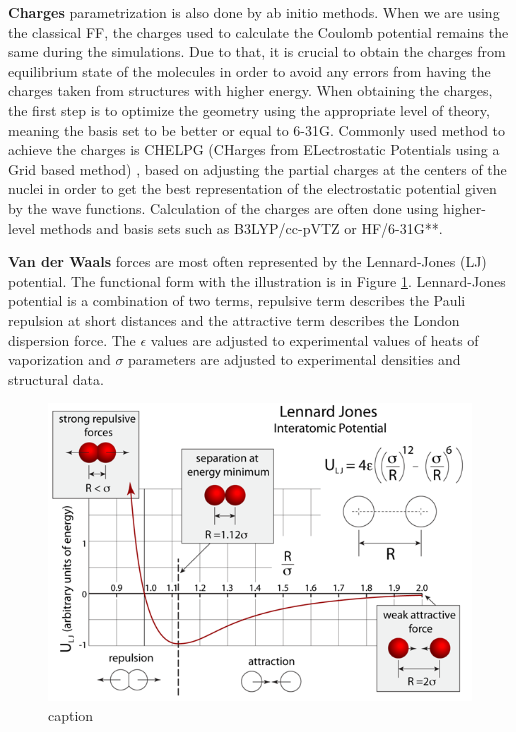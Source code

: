 \textbf{Charges} parametrization is also done by ab initio methods. When we are using the classical FF, the charges used to calculate the Coulomb potential remains the same during the simulations. Due to that, it is crucial to obtain the charges from equilibrium state of the molecules in order to avoid any errors from having the charges taken from structures with higher energy. When obtaining the charges, the first step is to optimize the geometry using the appropriate level of theory, meaning the basis set to be better or equal to 6-31G. Commonly used method to achieve the charges is CHELPG (CHarges from ELectrostatic Potentials using a Grid based method) \cite{breneman_determining_1990}, based on adjusting the partial charges at the centers of the nuclei in order to get the best representation of the electrostatic potential given by the wave functions. Calculation of the charges are often done using higher-level methods and basis sets such as B3LYP/cc-pVTZ or HF/6-31G**.

\textbf{Van der Waals} forces are most often represented by the Lennard-Jones (LJ) potential. The functional form with the illustration is in Figure \ref{fig:lj}. Lennard-Jones potential is a combination of two terms, repulsive term describes the Pauli repulsion at short distances and the attractive term describes the London dispersion force. The $\epsilon$ values are adjusted to experimental values of heats of vaporization and $\sigma$ parameters are adjusted to experimental densities and structural data. 

\begin{figure}[H]
	\centering
	\includegraphics[width=1.0\linewidth]{img/lj.png} 
	\caption{caption}
	\label{fig:lj}    
\end{figure} 


